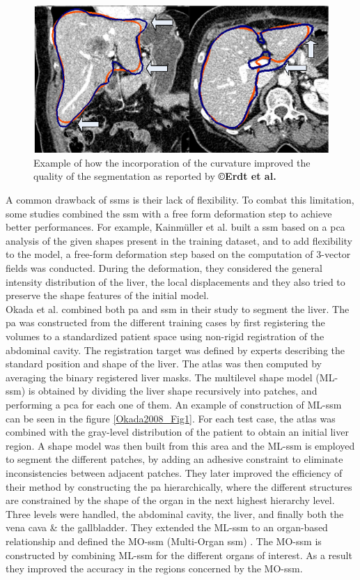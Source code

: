\begin{figure}[th!]
	\centering
	\includegraphics[width=0.4\linewidth]{images/Erdt2010_Fig3}
	\caption{Example of how the incorporation of the curvature improved the quality of the segmentation as reported by \textbf{©Erdt et al. \cite{Erdt2010}}}
	\label{Erdt2010_Fig3}
\end{figure}


A common drawback of \ac{ssm}s is their lack of flexibility. To combat this
limitation, some studies combined the \ac{ssm} with a free form deformation
step to achieve better performances. For example, Kainmüller et al. \cite{Kainmueller2007} built a \ac{ssm} based on a \ac{pca} analysis of the given shapes
present in the training dataset, and to add flexibility to the model, a
free-form deformation step based on the computation of 3-vector fields
was conducted. During the deformation, they considered the general
intensity distribution of the liver, the local displacements and they
also tried to preserve the shape features of the initial model.\\
Okada et al. \cite{Okada2008} combined both \ac{pa} and \ac{ssm} in their study to segment the liver. The \ac{pa} was
constructed from the different training cases by first registering the
volumes to a standardized patient space using non-rigid registration of
the abdominal cavity. The registration target was defined by experts
describing the standard position and shape of the liver. The atlas was
then computed by averaging the binary registered liver masks. The
multilevel shape model (ML-\ac{ssm}) is obtained by dividing the liver shape
recursively into patches, and performing a \ac{pca} for each one of them. An
example of construction of ML-\ac{ssm} can be seen in the figure \ref{Okada2008_Fig1}.
For each test case, the atlas was combined with the gray-level
distribution of the patient to obtain an initial liver region. A shape
model was then built from this area and the ML-\ac{ssm} is employed to
segment the different patches, by adding an adhesive constraint to
eliminate inconsistencies between adjacent patches. They later improved
the efficiency of their method by constructing the \ac{pa} hierarchically,
where the different structures are constrained by the shape of the organ
in the next highest hierarchy level. Three levels were handled, the
abdominal cavity, the liver, and finally both the vena cava \& the
gallbladder. They extended the ML-\ac{ssm} to an organ-based relationship and
defined the MO-\ac{ssm} (Multi-Organ \ac{ssm}) \cite{Okada2008}. The MO-\ac{ssm} is constructed by combining ML-\ac{ssm} for the
different organs of interest. As a result they improved the accuracy in
the regions concerned by the MO-\ac{ssm}.

